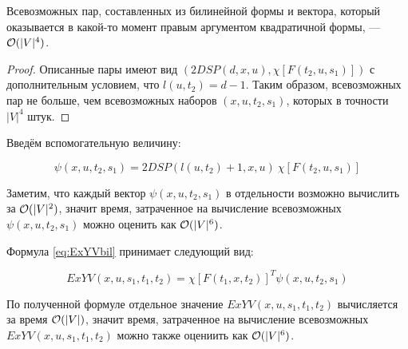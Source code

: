 \begin{proposition}
Всевозможных пар, составленных из билинейной формы и вектора, который оказывается в какой-то момент правым аргументом квадратичной формы, --- $\mathcal{O}(|V|^4)$.
\end{proposition}
\begin{proof}
Описанные пары имеют вид $(2DSP(d, x, u), \chi[F(t_2, u, s_1)])$ с дополнительным условием, что $l(u, t_2) = d - 1$. Таким образом, всевозможных пар не больше, чем всевозможных наборов $(x, u, t_2, s_1)$, которых в точности $|V|^4$ штук.
\end{proof}

Введём вспомогательную величину:

\begin{equation}
\psi(x, u, t_2, s_1) = 2DSP(l(u, t_2) + 1, x, u)~\chi[F(t_2, u, s_1)] \label{eq:psi}
\end{equation}

Заметим, что каждый вектор $\psi(x, u, t_2, s_1)$ в отдельности возможно вычислить за $\mathcal{O}(|V|^2)$, значит время, затраченное на вычисление всевозможных $\psi(x, u, t_2, s_1)$ можно оценить как $\mathcal{O}(|V|^6)$. 

Формула \eqref{eq:ExYVbil} принимает следующий вид:

\begin{equation}
ExYV(x, u, s_1, t_1, t_2) = \chi[F(t_1, x, t_2)]^T \psi(x, u, t_2, s_1) \label{eq:ExYVpsi}
\end{equation}

По полученной формуле отдельное значение $ExYV(x, u, s_1, t_1, t_2)$ вычисляется за время $\mathcal{O}(|V|)$, значит время, затраченное на вычисление всевозможных $ExYV(x, u, s_1, t_1, t_2)$ можно также оцениить как $\mathcal{O}(|V|^6)$.

